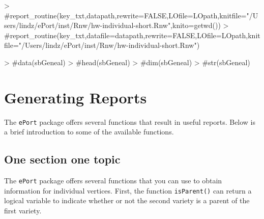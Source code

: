 \documentclass{article}
\numberwithin{equation}{section} %
\newcommand{\pkg}[1]{{\texttt{#1}}}
\begin{document}
\begin{Schunk}
\end{Schunk}

\begin{Schunk}
\begin{Sinput}
> #report_routine(key_txt,datapath,rewrite=FALSE,LOfile=LOpath,knitfile="/Users/lindz/ePort/inst/Rnw/hw-individual-short.Rnw",knito=getwd())
> #report_routine(key_txt,datafile=datapath,rewrite=FALSE,LOfile=LOpath,knitfile="/Users/lindz/ePort/inst/Rnw/hw-individual-short.Rnw")
\end{Sinput}
\end{Schunk}

\begin{Schunk}
\begin{Sinput}
> #data(sbGeneal)
> #head(sbGeneal)
> #dim(sbGeneal)
> #str(sbGeneal)
\end{Sinput}
\end{Schunk}

\section{Generating Reports}

The \pkg{ePort} package offers several functions that result in useful reports. Below is a brief introduction to some of the available functions.

\subsection{One section one topic}

The \pkg{ePort} package offers several functions that you can use to obtain information for individual vertices. First, the function \texttt{isParent()} can return a logical variable to indicate whether or not the second variety is a parent of the first variety.
\end{document}
